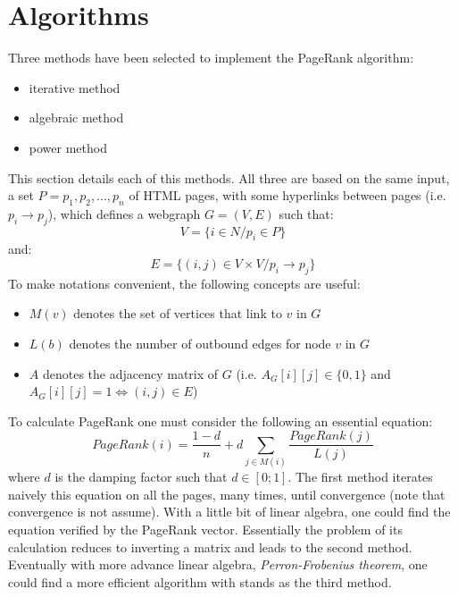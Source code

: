 \documentclass[pdftex,12pt,a4paper]{article}
\begin{document}
\section{Algorithms}

Three methods have been selected to implement the PageRank algorithm:
\begin{itemize}
\item iterative method
\item algebraic method
\item power method
\end{itemize}
This section details each of this methods. All three are based on the same input, a set $P = p_1, p_2, ..., p_n$ of HTML pages, with some hyperlinks between pages (i.e. $p_i \rightarrow p_j$), which defines a webgraph $G = \left(V, E\right)$ such that:
$$V = \{i \in N / p_i \in P\}$$
and:
$$E = \{\left(i, j\right) \in V \times V / p_i \rightarrow p_j\}$$
To make notations convenient, the following concepts are useful:
\begin{itemize}
\item $M\left(v\right)$ denotes the set of vertices that link to $v$ in $G$
\item $L\left(b\right)$ denotes the number of outbound edges for node $v$ in $G$
\item $A$ denotes the adjacency matrix of $G$ (i.e. $A_G\left[i\right]\left[j\right] \in \{0, 1\}$ and $A_G\left[i\right]\left[j\right] = 1 \Leftrightarrow \left(i, j\right) \in E$)
\end{itemize}

To calculate PageRank one must consider the following an essential equation:
$$ PageRank \left( i \right) = \frac{1 - d}{n} + d \sum\limits_{j \in M \left( i \right)} \frac{PageRank \left( j \right)}{L \left( j \right)}$$
where $d$ is the damping factor such that $d \in \left[ 0;1 \right] $. The first method iterates naively this equation on all the pages, many times, until convergence (note that convergence is not assume). With a little bit of linear algebra, one could find the equation verified by the PageRank vector. Essentially the problem of its calculation reduces to inverting a matrix and leads to the second method. Eventually with more advance linear algebra, \emph{Perron-Frobenius theorem}, one could find a more efficient algorithm with stands as the third method.
\end{document}
